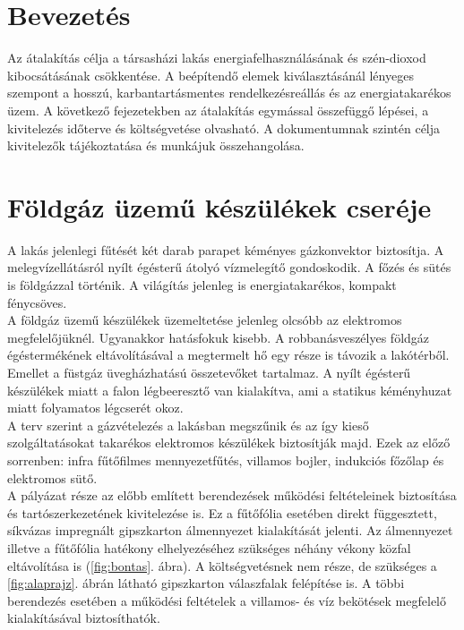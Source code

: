 
 
 
\graphicspath{ {../rajz/} }


%

\tableofcontents

\clearpage

\section{Bevezetés}
\label{sec:bevezetes}
Az átalakítás célja a társasházi lakás energiafelhasználásának és szén-dioxod kibocsátásának csökkentése.
A beépítendő elemek kiválasztásánál lényeges szempont a hosszú, karbantartásmentes rendelkezésreállás és az energiatakarékos üzem.
A következő fejezetekben az átalakítás egymással összefüggő lépései, a kivitelezés időterve és költségvetése olvasható.
A dokumentumnak szintén célja kivitelezők tájékoztatása és munkájuk összehangolása. 

\section{Földgáz üzemű készülékek cseréje}
\label{sec:foldgazcsere}
A lakás jelenlegi fűtését két darab parapet kéményes gázkonvektor biztosítja.
A melegvízellátásról nyílt égésterű átolyó vízmelegítő gondoskodik. 
A főzés és sütés is földgázzal történik. 
A világítás jelenleg is energiatakarékos, kompakt fénycsöves. \\

A földgáz üzemű készülékek üzemeltetése jelenleg olcsóbb az elektromos megfelelőjüknél.
Ugyanakkor hatásfokuk kisebb. A robbanásveszélyes földgáz égéstermékének eltávolításával a
megtermelt hő egy része is távozik a lakótérből. Emellet a füstgáz üvegházhatású összetevőket tartalmaz.
A nyílt égésterű készülékek miatt a falon légbeeresztő van kialakítva, ami a statikus kéményhuzat miatt
folyamatos légcserét okoz. \\

A terv szerint a gázvételezés a lakásban megszűnik és az így kieső szolgáltatásokat takarékos
elektromos készülékek biztosítják majd. Ezek az előző sorrenben: infra fűtőfilmes mennyezetfűtés, 
villamos bojler, indukciós főzőlap és elektromos sütő. \\

A pályázat része az előbb említett berendezések működési feltételeinek biztosítása és 
tartószerkezetének kivitelezése is. Ez a fűtőfólia esetében direkt függesztett, síkvázas 
impregnált gipszkarton álmennyezet kialakítását jelenti.
Az álmennyezet illetve a fűtőfólia hatékony elhelyezéséhez szükséges néhány vékony 
közfal eltávolítása is (\ref{fig:bontas}. ábra). A költségvetésnek nem része, de szükséges
a \ref{fig:alaprajz}. ábrán látható gipszkarton válaszfalak felépítése is.
A többi berendezés esetében a működési feltételek a villamos- és víz bekötések megfelelő kialakításával biztosíthatók. \\

